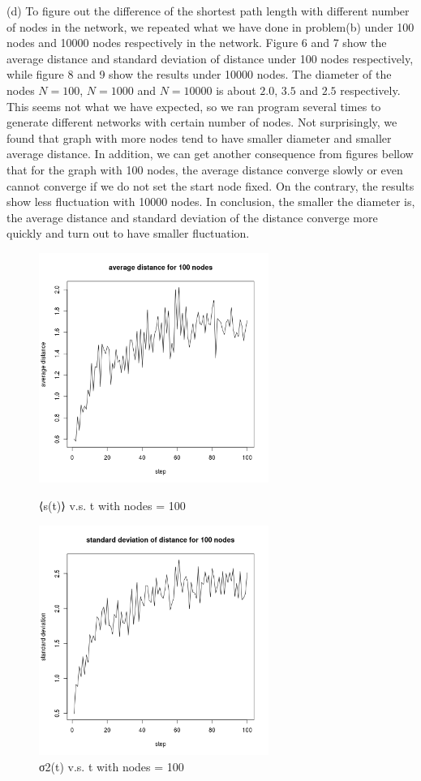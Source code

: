 \documentclass[draftcls,12pt,onecolumn]{IEEEtran}
\begin{document}
(d) To figure out the difference of the shortest path length with different number of nodes in the network, we repeated what we have done in problem(b) under 100 nodes and 10000 nodes respectively in the network. Figure 6 and 7 show the average distance and standard deviation of distance under 100 nodes respectively, while figure 8 and 9 show the results under 10000 nodes.
The diameter of the nodes $N = 100$, $N = 1000$ and $N = 10000$ is about $2.0$, $3.5$ and $2.5$ respectively. This seems not what we have expected, so we ran program several times to generate different networks with certain number of nodes. Not surprisingly, we found that graph with more nodes tend to have smaller diameter and smaller average distance. In addition, we can get another consequence from figures bellow that for the graph with 100 nodes, the average distance converge slowly or even cannot converge if we do not set the start node fixed. On the contrary, the results show less fluctuation with 10000 nodes. In conclusion, the smaller the diameter is, the average distance and standard deviation of the distance converge more quickly and turn out to have smaller fluctuation. 
\begin{figure}[htbp]
\centering
\begin{minipage}[t]{0.48\textwidth}
\centering
\includegraphics[width=7.5cm]{2_1_d_100_distance.png}
\caption{⟨s(t)⟩ v.s. t with nodes = 100}
\end{minipage}
\begin{minipage}[t]{0.48\textwidth}
\centering
\includegraphics[width=7.5cm]{2_1_d_100_deviation.png}
\caption{σ2(t) v.s. t with nodes = 100}
\end{minipage}
\end{figure}
\end{document}
